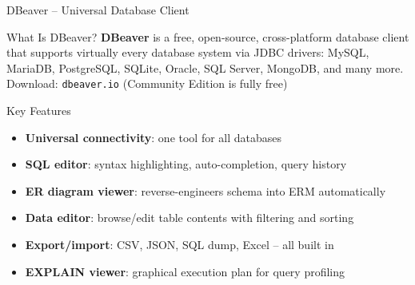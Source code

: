 \begin{frame}{DBeaver -- Universal Database Client}
  \begin{block}{What Is DBeaver?}
    \textbf{DBeaver} is a free, open-source, cross-platform database client that supports
    virtually every database system via JDBC drivers: MySQL, MariaDB, PostgreSQL,
    SQLite, Oracle, SQL Server, MongoDB, and many more.\\[0.3em]
    Download: \texttt{dbeaver.io} \quad (Community Edition is fully free)
  \end{block}

  \begin{block}{Key Features}
    \begin{itemize}
      \item \textbf{Universal connectivity}: one tool for all databases
      \item \textbf{SQL editor}: syntax highlighting, auto-completion, query history
      \item \textbf{ER diagram viewer}: reverse-engineers schema into ERM automatically
      \item \textbf{Data editor}: browse/edit table contents with filtering and sorting
      \item \textbf{Export/import}: CSV, JSON, SQL dump, Excel -- all built in
      \item \textbf{EXPLAIN viewer}: graphical execution plan for query profiling
    \end{itemize}
  \end{block}
\end{frame}

